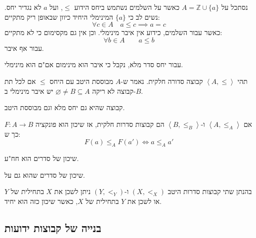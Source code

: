 \documentclass{tstextbook}
\begin{document}
\begin{example}
נסתכל על \(A=\mathbb{Z}\cup \{ a \}\) כאשר על השלמים נשתמש ביחס הידוע \(\leq\), ועל \(a\) לא נגדיר יחס. נשים לב כי \(\{ a \}\) המינימלי היחיד כיוון שבאופן ריק מתקיים:
$$\forall c \in A\quad a\leq c\implies a=c$$
כאשר עבור השלמים, כידוע אין איבר מינימלי. וכן אין גם מקסימום כי לא מתקיים:
$$\forall b \in A\qquad a\leq b$$
עבור אף איבר.

\end{example}
\begin{proposition}
עבור יחס סדר מלא, נקבל כי איבר הוא מינימום אם"ם הוא מינימלי.

\end{proposition}
\begin{definition}
תהי \(\left\langle  A,\leq  \right\rangle\) קבוצה סדורה חלקית. נאמר ש-\(A\) מבוססת היטב עם היחס \(\leq\) אם לכל תת קבוצה לא ריקה \(\varnothing \neq B \subseteq A\) יש איבר מינימלי ב-\(B\).

\end{definition}
\begin{definition}
קבוצה שהיא גם יחס מלא וגם מבוססת היטב.

\end{definition}
\begin{definition}
אם \(\left\langle  A,\leq_{A}  \right\rangle\) ו-\(\left\langle  B,\leq_{B}  \right\rangle\) הם קבוצות סדרות חלקית, אז שיכון הוא פונקציה \(F:A\to B\) כך ש:
$$F(a)\leq_{A}F(a')\iff a \leq_{A}a'$$

\end{definition}
\begin{proposition}
שיכון של סדרים הוא חח"ע.

\end{proposition}
\begin{definition}
שיכון של סדרים שהוא גם על.

\end{definition}
\begin{proposition}
בהנתן שתי קבוצות סדרות היטב \((X,<_{X})\) ו-\((Y,<_{Y})\) ניתן לשכן את \(X\) בתחילית של \(Y\) או לשכן את \(Y\) בתחילית של \(X\), כאשר שיכון כזה הוא יחיד.

\end{proposition}
\subsection{בנייה של קבוצות ידועות}
\end{document}
